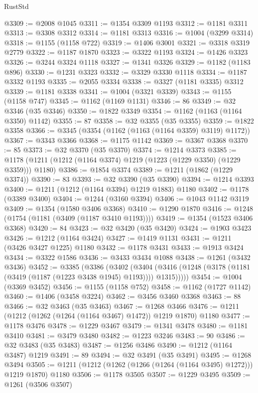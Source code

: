 \begin{lexlean}{RustStd}
\begin{coremodule}
{\begin{coremodule}
{{{{{{{{{{{{{{{{{{{{{{{{{{{{{{{{@3309 := @2008 @1045
@3311 := @1354 @3309 @1193
@3312 := @1181 @3311
@3313 := @3308 @3312
@3314 := @1181 @3313
@3316 := @1004 (@3299 @3314)
@3318 := @1155 (@1158 @722)
@3319 := @1406 @3001
@3321 := @3318 @3319 @2779
@3322 := @1187 @1870
@3323 := @3322 @1193
@3324 := @1426 @3323
@3326 := @3244 @3324 @1118
@3327 := @1341 @3326
@3329 := @1182 (@1183 @896)
@3330 := @1231 @3323
@3332 := @3329 @3330 @1118
@3334 := @1187 @3332 @1193
@3335 := @2055 @3334
@3338 := @3327 (@1181 @3335) @3312
@3339 := @1181 @3338
@3341 := @1004 (@3321 @3339)
@3343 := @1155 (@1158 @747)
@3345 := @1162 (@1169 @1131)
@3346 := 86
@3349 := @32 @3346 (@35 @3346)
@3350 := @1822 @3349
@3354 := @1162 (@1163 (@1164 @3350) @1142)
@3355 := 87
@3358 := @32 @3355 (@35 @3355)
@3359 := @1822 @3358
@3366 := @3345 (@3354 (@1162 (@1163 (@1164 @3359) @3119) @1172))
@3367 := @3343 @3366
@3368 := @1175 @1142
@3369 := @3367 @3368
@3370 := 85
@3373 := @32 @3370 (@35 @3370)
@3374 := @1214 @3373
@3385 := @1178 (@1211 (@1212 (@1164 @3374) @1219 (@1223 (@1229 @3350) (@1229 @3359))) @1180)
@3386 := @1854 @3374
@3389 := @1211 (@1862 (@1229 @3374))
@3390 := 83
@3393 := @32 @3390 (@35 @3390)
@3394 := @1214 @3393
@3400 := @1211 (@1212 (@1164 @3394) @1219 @1883) @1180
@3402 := @1178 (@3389 @3400)
@3404 := @1244 (@3160 @3394)
@3406 := @1043 @1142 @3119
@3409 := @1354 (@1580 @3406 @3368)
@3410 := @1290 @1870
@3416 := @1248 (@1754 (@1181 (@3409 (@1187 @3410 @1193))))
@3419 := @1354 (@1523 @3406 @3368)
@3420 := 84
@3423 := @32 @3420 (@35 @3420)
@3424 := @1903 @3423
@3426 := @1212 (@1164 @3424)
@3427 := @1419 @1131
@3431 := @1211 (@3426 @3427 @1225) @1180
@3432 := @1178 @3431
@3433 := @1913 @3424
@3434 := @3322 @1586
@3436 := @3433 @3434 @1088
@3438 := @1261 (@3432 @3436)
@3452 := @3385
    (@3386
      (@3402
        (@3404 (@3416 (@1248 (@3178 (@1181 (@3419 (@1187 (@1223 @3438 @1945) @1193)))) @1315)))))
@3454 := @1004 (@3369 @3452)
@3456 := @1155 (@1158 @752)
@3458 := @1162 (@1727 @1142)
@3460 := @1406 (@3458 @3224)
@3462 := @3456 @3460 @3368
@3463 := 88
@3466 := @32 @3463 (@35 @3463)
@3467 := @1268 @3466
@3476 := @1211 (@1212 (@1262 (@1264 (@1164 @3467) @1472)) @1219 @1870) @1180
@3477 := @1178 @3476
@3478 := @1229 @3467
@3479 := @1341 @3478
@3480 := @1181 @3410
@3481 := @3479 @3480
@3482 := @1223 @3246
@3483 := 90
@3486 := @32 @3483 (@35 @3483)
@3487 := @1256 @3486
@3490 := @1212 (@1164 @3487) @1219
@3491 := 89
@3494 := @32 @3491 (@35 @3491)
@3495 := @1268 @3494
@3505 := @1211 (@1212 (@1262 (@1266 (@1264 (@1164 @3495) @1272))) @1219 @1870) @1180
@3506 := @1178 @3505
@3507 := @1229 @3495
@3509 := @1261 (@3506 @3507)
}}}}}}}}}}}}}}}}}}}}}}}}}}}}}}}}
\end{coremodule}}
\end{coremodule}
\end{lexlean}
